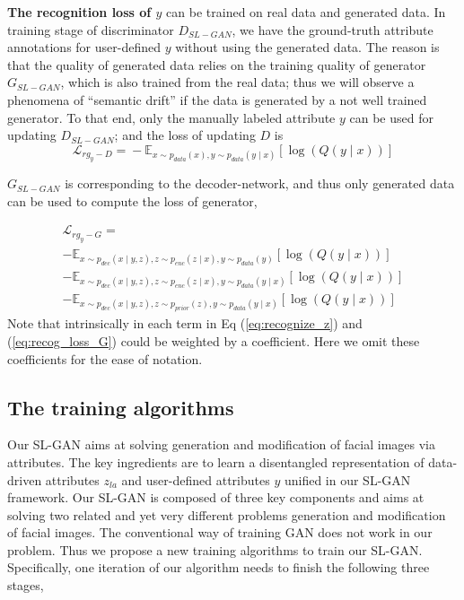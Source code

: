 \documentclass[10pt,letterpaper,twocolumn]{article}
\begin{document}
\noindent \textbf{The recognition loss of $y$} can be trained on
real data and generated data. In training stage of discriminator $D_{SL-GAN}$,
we have the ground-truth attribute annotations for user-defined $y$
without using the generated data. The reason is that the quality of
generated data relies on the training quality of generator $G_{SL-GAN}$,
which is also trained from the real data; thus we will observe a phenomena
of ``semantic drift'' if the data is generated by a not well trained
generator. To that end, only the manually labeled attribute $y$ can
be used for updating $D_{SL-GAN}$; and the loss of updating $D$
is 
\begin{equation}
\mathcal{L}_{rg_{y}-D}\!=\!-\mathbb{E}_{x\sim p_{data}(x),y\sim p_{data}\left(y\mid x\right)}\left[\log\left(Q\left(y\mid x\right)\right)\right]\label{eq:recog_loss_D}
\end{equation}

$G_{SL-GAN}$ is corresponding to the decoder-network, and thus only
generated data can be used to compute the loss of generator,

\begin{equation}
\begin{array}{cc}
\mathcal{L}_{rg_{y}-G}=\\
-\mathbb{E}_{x\sim p_{dec}\left(x\mid y,z\right),z\sim p_{enc}\left(z\mid x\right),y\sim p_{data}\left(y\right)}\left[\log\left(Q\left(y\mid x\right)\right)\right]\\
-\mathbb{E}_{x\sim p_{dec}(x\mid y,z),z\sim p_{enc}\left(z\mid x\right),y\sim p_{data}\left(y\mid x\right)}\left[\log\left(Q\left(y\mid x\right)\right)\right]\\
-\mathbb{E}_{x\sim p_{dec}\left(x\mid y,z\right),z\sim p_{prior}\left(z\right),y\sim p_{data}\left(y\mid x\right)}\left[\log\left(Q\left(y\mid x\right)\right)\right]
\end{array}\label{eq:recog_loss_G}
\end{equation}
Note that intrinsically in each term in Eq (\ref{eq:recognize_z})
and (\ref{eq:recog_loss_G}) could be weighted by a coefficient. Here
we omit these coefficients for the ease of notation.

\subsection{The training algorithms}

Our SL-GAN aims at solving generation and modification of facial images
via attributes. The key ingredients are to learn a disentangled representation
of data-driven attributes $z_{la}$ and user-defined attributes $y$
unified in our SL-GAN framework. Our SL-GAN is composed of three key
components and aims at solving two related and yet very different
problems \textendash{} generation and modification of facial images.
The conventional way of training GAN does not work in our problem.
Thus we propose a new training algorithms to train our SL-GAN. Specifically,
one iteration of our algorithm needs to finish the following three
stages,
\end{document}
